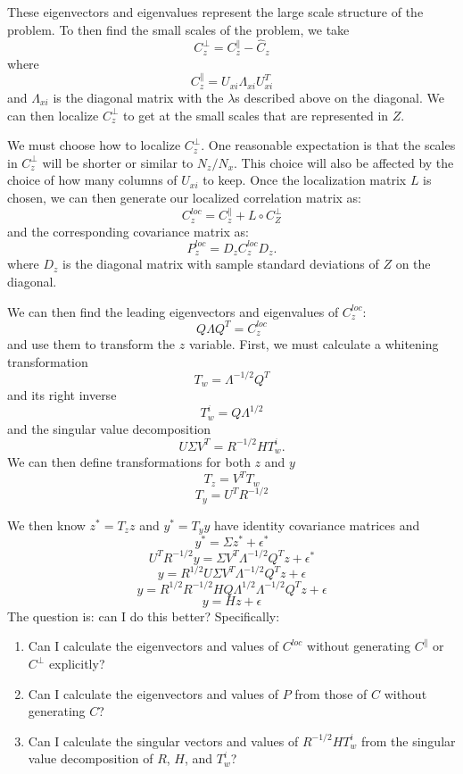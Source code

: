\documentclass[11pt]{article} %
\begin{document}
These eigenvectors and eigenvalues represent the large scale structure of the problem.
To then find the small scales of the problem, we take
\[
C_z^\bot = C_z^\parallel - \hat{C}_z
\]
where
\[
C_z^\parallel = U_{xi} \Lambda_{xi}  U_{xi}^T
\]
and $\Lambda_{xi}$ is the diagonal matrix with the $\lambda$s described above on the diagonal.
We can then localize $C_z^\bot$ to get at the small scales that are represented in $Z$.

We must choose how to localize $C_z^\bot$.
One reasonable expectation is that the scales in $C_z^\bot$ will be shorter or similar to $N_z/N_x$.
This choice will also be affected by the choice of how many columns of $U_{xi}$ to keep.
Once the localization matrix $L$ is chosen, we can then generate our localized correlation matrix as:
\[
C_z^{loc} = C_z^\parallel + L \circ C_Z^\bot
\]
and the corresponding covariance matrix as:
\[
P_z^{loc} = D_z C_z^{loc} D_z.
\]
where $D_z$ is the diagonal matrix with sample standard deviations of $Z$ on the diagonal.

We can then find the leading eigenvectors and eigenvalues of $C_z^{loc}$:
\[
Q \Lambda Q^T = C_z^{loc}
\]
and use them to transform the $z$ variable.
First, we must calculate a whitening transformation
\[
T_w = \Lambda^{-1/2} Q^T
\]
and its right inverse
\[
T_w^i = Q \Lambda^{1/2}
\]
and the singular value decomposition
\[
U \Sigma V^T = R^{-1/2} H T_w^i.
\]
We can then define transformations for both $z$ and $y$
\[
T_z = V^T T_w
\]
\[
T_y = U^T R^{-1/2}
\]

We then know $z^* = T_z z$ and $y^* = T_y y$ have identity covariance matrices and
\[
y^* = \Sigma z^* + \epsilon^*
\]
\[
U^T R^{-1/2} y = \Sigma V^T \Lambda^{-1/2} Q^T z + \epsilon^*
\]
\[
y = R^{1/2} U \Sigma V^T \Lambda^{-1/2} Q^T z  + \epsilon
\]
\[
y = R^{1/2}R^{-1/2} H Q \Lambda^{1/2} \Lambda^{-1/2} Q^T z  + \epsilon
\]
\[
y = H z  + \epsilon
\]
The question is: can I do this better?
Specifically:
\begin{enumerate}
\item Can I calculate the eigenvectors and values of $C^{loc}$ without generating $C^\parallel$ or $C^\bot$ explicitly?
\item Can I calculate the eigenvectors and values of $P$ from those of $C$ without generating $C$?
\item Can I calculate the singular vectors and values of $R^{-1/2} H T_w^i$ from the singular value decomposition of $R$, $H$, and $T_w^i$?
\end{enumerate}
\end{document}
